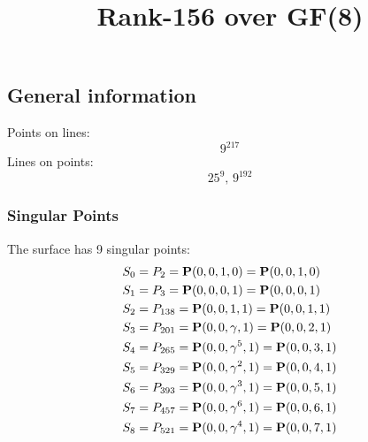 \documentclass{article}
\newcommand\setTBstruts{\def\T{\rule{0pt}{2.6ex}}%
\def\B{\rule[-1.2ex]{0pt}{0pt}}}
\newcommand{\bP}{{\bf P}}
\begin{document}
 
\setTBstruts



{\allowdisplaybreaks%






\title{Rank-156 over GF(8)}
\author{}%
\maketitle%
%
{}



\subsection*{General information}
Points on lines:
$$
9^{217}$$
Lines on points:
$$
25^9,\,9^{192}$$
\subsubsection*{Singular Points}
The surface has 9 singular points:\\
\begin{align*}
S_{0} &= P_{2}=\bP(0, 0, 1, 0) = \bP(0, 0, 1, 0)\\
S_{1} &= P_{3}=\bP(0, 0, 0, 1) = \bP(0, 0, 0, 1)\\
S_{2} &= P_{138}=\bP(0, 0, 1, 1) = \bP(0, 0, 1, 1)\\
S_{3} &= P_{201}=\bP(0, 0, \gamma , 1) = \bP(0, 0, 2, 1)\\
S_{4} &= P_{265}=\bP(0, 0, \gamma^{5}, 1) = \bP(0, 0, 3, 1)\\
S_{5} &= P_{329}=\bP(0, 0, \gamma^{2}, 1) = \bP(0, 0, 4, 1)\\
S_{6} &= P_{393}=\bP(0, 0, \gamma^{3}, 1) = \bP(0, 0, 5, 1)\\
S_{7} &= P_{457}=\bP(0, 0, \gamma^{6}, 1) = \bP(0, 0, 6, 1)\\
S_{8} &= P_{521}=\bP(0, 0, \gamma^{4}, 1) = \bP(0, 0, 7, 1)\\
\end{align*}
}
\end{document}
